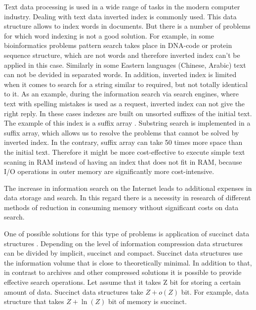 

Text data processing is used in a wide range of tasks in the modern computer industry.
Dealing with text data inverted index \cite{zobel2006inverted} is commonly used. This data structure
allows to index words in documents.
But there is a number of problems for which word indexing is not a good solution.
For example, in some bioinformatics problems \cite{tsuruoka2008facta} pattern search takes place
in DNA-code or protein sequence structure, which are not words and therefore inverted index
can't be applied in this case.
Similarly in some Eastern languages (Chinese, Arabic) text can not be devided in separated words.
In addition, inverted index is limited when it comes to search for a string similar to required,
but not totally identical to it. As an example, during the information search via search engines,
where text with spelling mistakes is used as a request, inverted index can not give the right reply.
In these cases indexes are built on unsorted suffixes of the initial text.
The example of this index is a suffix array \cite{manber1993suffix}.
Substring search is implemented in a suffix array, which allows us to resolve the problems
that cannot be solved by inverted index.
In the contrary, suffix array can take 50 times more space than the initial text.
Therefore it might be more cost-effective to execute simple text scaning in RAM 
instead of having an index that does not fit in RAM,
because I/O operations in outer memory are significantly more cost-intensive.

The increase in information search on the Internet leads to additional expenses in data storage and search.
In this regard there is a necessity in research of different methods of reduction in consuming memory without 
significant costs on data search.

One of possible solutions for this type of problems is application
of succinct data structures \cite{jacobson1988succinct}.
Depending on the level of information compression data structures can be divided by implicit, succinct and compact.
Succinct data structures use the information volume that is close to theoretically minimal.
In addition to that, in contrast to archives and other compressed solutions 
it is possible to provide effective search operations.
Let assume that it takes Z bit for storing a certain amount of data.
Succinct data structures take \(Z + o(Z)\) bit. 
For example, data structure that takes \(Z + \ln(Z)\) bit of memory is succinct.

